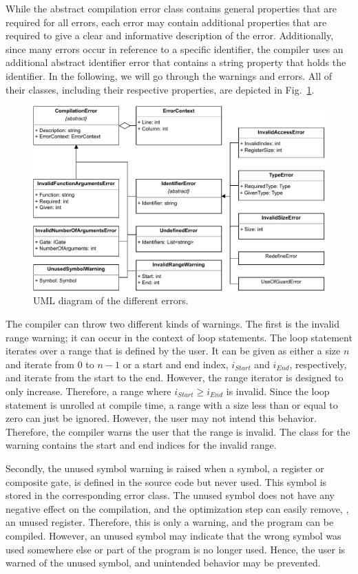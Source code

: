 While the abstract compilation error class contains general properties that are required for all errors, each error may contain additional properties that are required to give a clear and informative description of the error. Additionally, since many errors occur in reference to a specific identifier, the compiler uses an additional abstract identifier error that contains a string property that holds the identifier. In the following, we will go through the warnings and errors. All of their classes, including their respective properties, are depicted in Fig.~\ref{fig:implementation_uml_errors}.

\begin{figure}[htp]
    \centering
    \includegraphics[width=.9\textwidth]{../figures/drawio/uml_errors.pdf}
    \caption{UML diagram of the different errors.}
    \label{fig:implementation_uml_errors}
\end{figure}

The compiler can throw two different kinds of warnings. The first is the invalid range warning; it can occur in the context of loop statements. The loop statement iterates over a range that is defined by the user. It can be given as either a size $n$ and iterate from $0$ to $n-1$ or a start and end index, $i_{Start}$ and $i_{End}$, respectively, and iterate from the start to the end. However, the range iterator is designed to only increase. Therefore, a range where $i_{Start} \geq i_{End}$ is invalid. Since the loop statement is unrolled at compile time, a range with a size less than or equal to zero can just be ignored. However, the user may not intend this behavior. Therefore, the compiler warns the user that the range is invalid. The class for the warning contains the start and end indices for the invalid range.

Secondly, the unused symbol warning is raised when a symbol, \eg a register or composite gate, is defined in the source code but never used. This symbol is stored in the corresponding error class. The unused symbol does not have any negative effect on the compilation, and the optimization step can easily remove, \eg, an unused register. Therefore, this is only a warning, and the program can be compiled. However, an unused symbol may indicate that the wrong symbol was used somewhere else or part of the program is no longer used. Hence, the user is warned of the unused symbol, and unintended behavior may be prevented.

